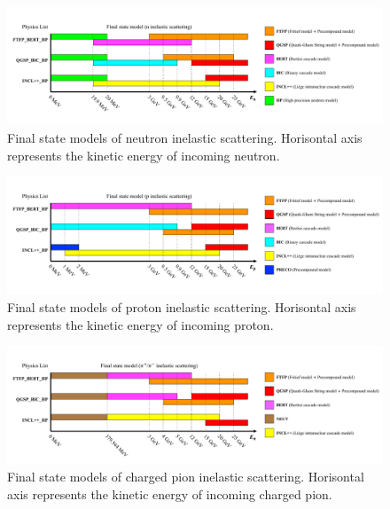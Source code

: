 \begin{figure}[H]
	\centering
	\includegraphics[width=16cm]{Figures/Simulation/model_ninel}
	\caption[Final state models of neutron inelastic scattering]{
	Final state models of neutron inelastic scattering.
	Horisontal axis represents the kinetic energy of incoming neutron.
	}\label{model_ninel}
\end{figure}

\begin{figure}[H]
	\centering
	\includegraphics[width=16cm]{Figures/Simulation/model_pinel}
	\caption[Final state models of proton inelastic scattering]{
	Final state models of proton inelastic scattering.
	Horisontal axis represents the kinetic energy of incoming proton.
	}\label{model_pinel}
\end{figure}

\begin{figure}[H]
	\centering
	\includegraphics[width=16cm]{Figures/Simulation/model_piinel}
	\caption[Final state models of charged pion inelastic scattering]{
	Final state models of charged pion inelastic scattering.
	Horisontal axis represents the kinetic energy of incoming charged pion.
	}\label{model_piinel}
\end{figure}

